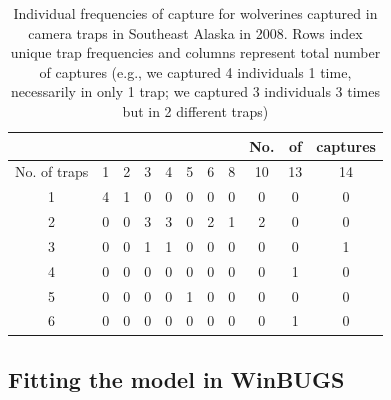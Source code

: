 \begin{table} [ht]
  \caption{Individual frequencies of capture for wolverines captured
    in camera traps in Southeast Alaska in 2008. Rows index unique
    trap frequencies and columns represent total number of captures
    (e.g., we captured 4 individuals 1 time, necessarily in only 1
    trap; we captured 3 individuals 3 times but in 2 different traps)}
\centering
\begin{tabular}{c c c c c c c c c c c}
\hline
 & & & & & & & &  No.&of&captures \\
\hline
No. of traps & 1 & 2 & 3 & 4 & 5 & 6 & 8 & 10 &13 &14 \\
\hline
1 & 4 & 1 & 0 & 0 & 0 & 0 & 0 & 0 & 0 & 0 \\
2 & 0 & 0 & 3 & 3 & 0 & 2 & 1 & 2 & 0 & 0 \\ 
3 & 0 & 0 & 1 & 1 & 0 & 0 & 0 & 0 & 0 & 1 \\
4 & 0 & 0 & 0 & 0 & 0 & 0 & 0 & 0 & 1 & 0 \\
5 & 0 & 0 & 0 & 0 & 1 & 0 & 0 & 0 & 0 & 0 \\
6 & 0 & 0 & 0 & 0 & 0 & 0 & 0 & 0 & 1 & 0 \\
\hline
\end{tabular}

\end{table} 

\subsection{Fitting the model in WinBUGS}

